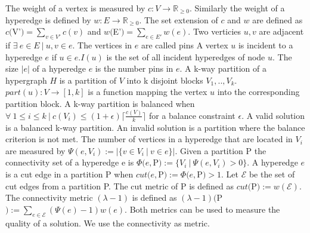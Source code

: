 \documentclass[a4paper,12pt,titlepage, BCOR7mm,headsepline]{scrbook}
\numberwithin{equation}{section}
\begin{document}
The weight of a vertex is measured by $c: V \rightarrow  \mathbb R_{\ge 0}$. Similarly the weight of a hyperedge is defined by $w: E \rightarrow  \mathbb R_{\ge 0}$. 
The set extension of $c$ and $w$ are defined as $c($V'$) = \sum_{v \in V'} c(v)$ and $w($E'$) = \sum_{e \in E'} w(e)$. 
Two verticies $u, v$ are adjacent if $\exists\ e \in E\ |\ u, v \in e$. The vertices in $e$ are called pins A vertex $u$ is incident to a hyperedge $e$ if $ u \in e$.$I(u)$ is the set of all incident hyperedges of node $u$. The size $|e|$ of a hyperedge $e$ is the number pins in $e$. A k-way partition of a hypergraph $H$ is a partition of $V$ into k disjoint blocks $V_1, .., V_k$. $part(u): V \rightarrow [1, k]$ is a function mapping the vertex $u$ into the corresponding partition block.
A k-way partition is balanced when $\forall\  1 \le i \le k\ |\ c(V_i) \le (1 + \epsilon) \lceil \frac{c(V)}{k} \rceil $ for a balance constraint $\epsilon$.
A valid solution is a balanced k-way partition. An invalid solution is a partition where the balance criterion is not met.
The number of vertices in a hyperedge that are located in $V_i$ are measured by $\Psi(e,V_i) := |\{v \in V_i \ |\ v \in e \}|$. Given a partition P the connectivity set of a hyperedge e is $\Phi(e, $P$) :=  \{V_i\ |\ \Psi(e, V_i) > 0\}$. 
A hyperedge $e$ is a cut edge in a partition P when $cut(e, $P$) := \Phi(e, $P$) > 1$. 
Let $\mathcal{E}$ be the set of cut edges from a partition P. The cut metric of P is defined as $cut($P$) := w(\mathcal{E})$.
The connectivity metric $(\lambda - 1)$ is defined as $(\lambda - 1)($P$) := \sum_{e \in \mathcal{E}}(\Psi(e) - 1)w(e)$.
Both metrics can be used to measure the quality of a solution. We use the connectivity as metric. 
\end{document}
